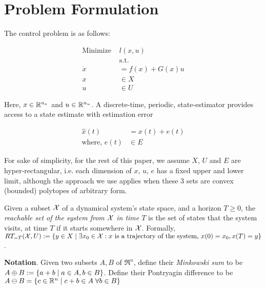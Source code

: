 \section{Problem Formulation} \label{sec:formulation}

The control problem is as follows:

\begin{subequations}
\label{eq:CtrlPrb}
\begin{align}
\text{Minimize } &l(x,u) \\
&\text{s.t.} \nonumber \\
\dot{x}&=f(x)+G(x)u \label{eq:NL_Plant} \\
x&\in X\\
u&\in U
\end{align}
\end{subequations}

Here, $x \in \mathbb{R}^{n_x}$ and $u \in \mathbb{R}^{n_u}$. A discrete-time, periodic, state-estimator provides access to a state estimate with estimation error

\begin{subequations}
\label{eq:NL_estimate}
\begin{align}
\hat{x}(t)&=x(t)+e(t) \\ 
\text{where, } e(t) &\in E
\end{align}
\end{subequations}

For sake of simplicity, for the rest of this paper, we assume $X$, $U$ and $E$ are hyper-rectangular, i.e. each dimension of $x$, $u$, $e$ has a fixed upper and lower limit, although the approach we use applies when these 3 sets are convex (bounded) polytopes of arbitrary form.

Given a subset $\mathcal{X}$ of a dynamical system's state space, and a horizon $T \geq 0$, the \emph{reachable set of the system from $\mathcal{X}$ in time $T$} is the set of states that the system visits, at time $T$ if it starts somewhere in $\mathcal{X}$.
Formally, $RT_{=T}(\mathcal{X},U) := \{y \in X \;|\; \exists x_0 \in \mathcal{X}: x \text{ is a trajectory of the system, }x(0)=x_0, x(T)=y\}$.

\textbf{Notation}.
Given two subsets $A,B$ of $\Re^n$, define their \textit{Minkowski sum} to be $A\oplus B := \{a+b \;|\; a\in A, b\in B\}$.
Define their Pontryagin difference to be $A\ominus B = \{c \in \mathbb{R}^n \;|\; c+b \in A\; \forall b \in B\}$